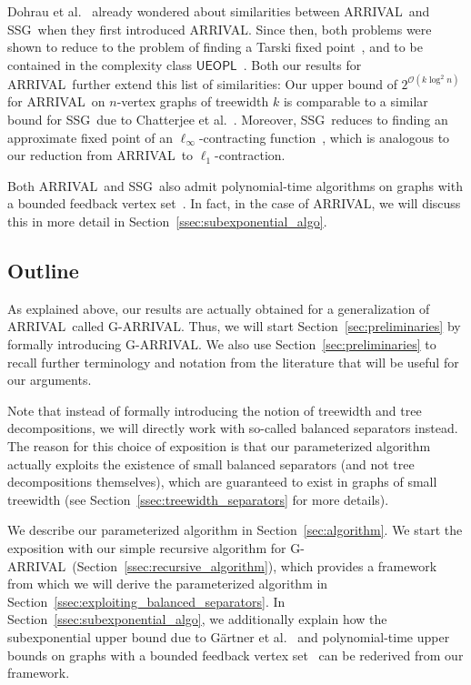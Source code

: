 \documentclass[a4paper,UKenglish,cleveref, autoref, thm-restate]{lipics-v2021}
\newcommand{\UEOPL}{\mathsf{UEOPL}}
\newcommand{\bigO}{\mathcal{O}}
\newcommand{\problem}[1]{\textrm{#1}}
\newcommand{\arrival}{\problem{ARRIVAL}}
\newcommand{\ssg}{\problem{SSG}}
\newcommand{\garrival}{\problem{G-ARRIVAL}}
\begin{document}
Dohrau et al.\@~\cite{dohrauARRIVALZeroPlayerGraph2017} already wondered about similarities between \arrival\ and \ssg\ when they first introduced \arrival. Since then, both problems were shown to reduce to the problem of finding a Tarski fixed point~\cite{etessamiTarskiTheoremSupermodular2020, gartnerSubexponentialAlgorithmARRIVAL2021}, and to be contained in the complexity class $\UEOPL$~\cite{fearnleyUniqueEndPotential2020}. Both our results for \arrival\ further extend this list of similarities: Our upper bound of $2^{\bigO(k \log^2 n)}$ for \arrival\ on $n$-vertex graphs of treewidth $k$ is comparable to a similar bound for \ssg\ due to Chatterjee et al.\@~\cite{chatterjeeFasterAlgorithmTurnbased2023}. Moreover, \ssg\ reduces to finding an approximate fixed point of an $\ell_\infty$-contracting function~\cite{condonComplexityStochasticGames1992}, which is analogous to our reduction from \arrival\ to $\ell_1$-contraction. 

Both \arrival\ and \ssg\ also admit polynomial-time algorithms on graphs with a bounded feedback vertex set~\cite{gartnerSubexponentialAlgorithmARRIVAL2021, augerFindingOptimalStrategies2014}. In fact, in the case of \arrival, we will discuss this in more detail in Section~\ref{ssec:subexponential_algo}.

\subsection{Outline}

As explained above, our results are actually obtained for a generalization of \arrival\ called \garrival. Thus, we will start Section~\ref{sec:preliminaries} by formally introducing \garrival. We also use Section~\ref{sec:preliminaries} to recall further terminology and notation from the literature that will be useful for our arguments. 

Note that instead of formally introducing the notion of treewidth and tree decompositions, we will directly work with so-called balanced separators instead. The reason for this choice of exposition is that our parameterized algorithm actually exploits the existence of small balanced separators (and not tree decompositions themselves), which are guaranteed to exist in graphs of small treewidth (see Section~\ref{ssec:treewidth_separators} for more details). 

We describe our parameterized algorithm in Section~\ref{sec:algorithm}. We start the exposition with our simple recursive algorithm for \garrival\ (Section~\ref{ssec:recursive_algorithm}), which provides a framework from which we will derive the parameterized algorithm in Section~\ref{ssec:exploiting_balanced_separators}. In Section~\ref{ssec:subexponential_algo}, we additionally explain how the subexponential upper bound due to Gärtner et al.\@~\cite{gartnerSubexponentialAlgorithmARRIVAL2021} and polynomial-time upper bounds on graphs with a bounded feedback vertex set~\cite{gartnerSubexponentialAlgorithmARRIVAL2021} can be rederived from our framework.
\end{document}
